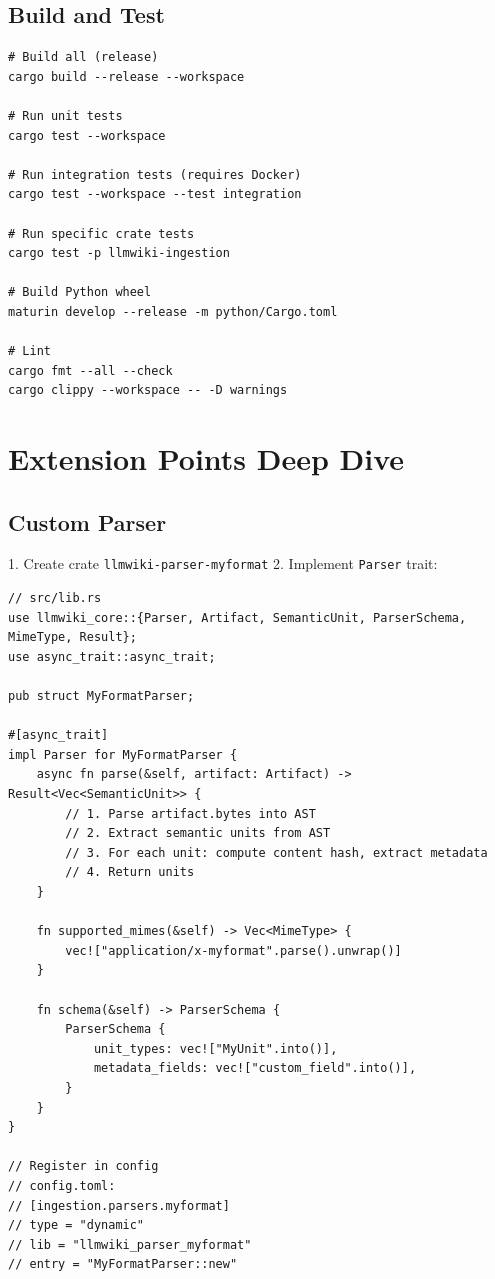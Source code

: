\subsection{Build and Test}
\label{sec:dev:build-test}

\begin{verbatim}
# Build all (release)
cargo build --release --workspace

# Run unit tests
cargo test --workspace

# Run integration tests (requires Docker)
cargo test --workspace --test integration

# Run specific crate tests
cargo test -p llmwiki-ingestion

# Build Python wheel
maturin develop --release -m python/Cargo.toml

# Lint
cargo fmt --all --check
cargo clippy --workspace -- -D warnings
\end{verbatim}

\section{Extension Points Deep Dive}
\label{sec:dev:extensions}

\subsection{Custom Parser}
\label{sec:dev:parser}

1. Create crate \texttt{llmwiki-parser-myformat}
2. Implement \texttt{Parser} trait:

\begin{verbatim}
// src/lib.rs
use llmwiki_core::{Parser, Artifact, SemanticUnit, ParserSchema, MimeType, Result};
use async_trait::async_trait;

pub struct MyFormatParser;

#[async_trait]
impl Parser for MyFormatParser {
    async fn parse(&self, artifact: Artifact) -> Result<Vec<SemanticUnit>> {
        // 1. Parse artifact.bytes into AST
        // 2. Extract semantic units from AST
        // 3. For each unit: compute content hash, extract metadata
        // 4. Return units
    }

    fn supported_mimes(&self) -> Vec<MimeType> {
        vec!["application/x-myformat".parse().unwrap()]
    }

    fn schema(&self) -> ParserSchema {
        ParserSchema {
            unit_types: vec!["MyUnit".into()],
            metadata_fields: vec!["custom_field".into()],
        }
    }
}

// Register in config
// config.toml:
// [ingestion.parsers.myformat]
// type = "dynamic"
// lib = "llmwiki_parser_myformat"
// entry = "MyFormatParser::new"
\end{verbatim}

